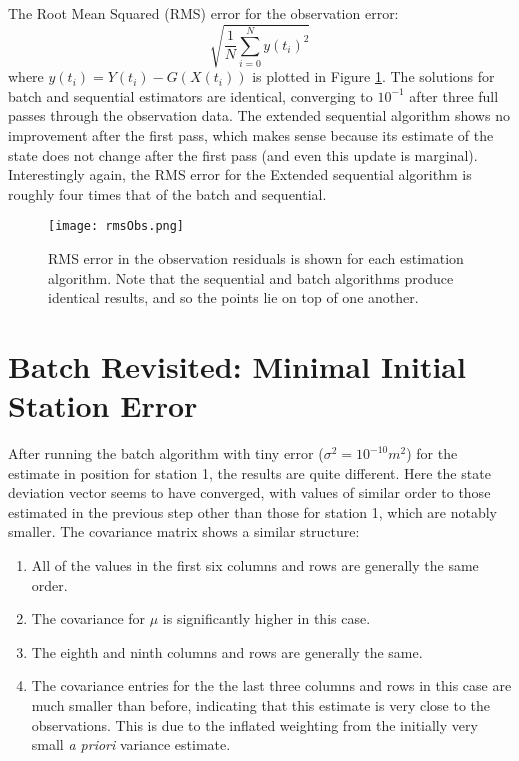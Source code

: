 \documentclass[a4paper,11pt]{article}
\begin{document}
  The Root Mean Squared (RMS) error for the observation error: 
    \begin{equation}
     \sqrt{\frac{1}{N}\sum_{i=0}^Ny(t_i)^2}     
    \end{equation}
  where $y(t_i) = Y(t_i) - G(X(t_i))$ is plotted in Figure \ref{fig:rmsObs}. The solutions for batch and sequential estimators are identical, converging to $10^{-1}$ after three full passes through the observation data. The extended sequential algorithm shows no improvement after the first pass, which makes sense because its estimate of the state does not change after the first pass (and even this update is marginal). Interestingly again, the RMS error for the Extended sequential algorithm is roughly four times that of the batch and sequential. 

	\begin{figure}
	\centering
	\texttt{[image: rmsObs.png]}
	\caption{RMS error in the observation residuals is shown for each estimation algorithm. Note that the sequential and batch algorithms produce identical results, and so the points lie on top of one another.}
	\label{fig:rmsObs}
	\end{figure}

\section{Batch Revisited: Minimal Initial Station Error}
\label{prob5}

	After running the batch algorithm with tiny error ($\sigma^2 = 10^{-10} m^2$) for the estimate in position for station 1, the results are quite different. Here the state deviation vector seems to have converged, with values of similar order to those estimated in the previous step other than those for station 1, which are notably smaller. The covariance matrix shows a similar structure:
	\begin{enumerate}
	  \item All of the values in the first six columns and rows are generally the same order. 
	  \item The covariance for $\mu$ is significantly higher in this case.
	  \item The eighth and ninth columns and rows are generally the same. 
	  \item The covariance entries for the the last three columns and rows in this case are much smaller than before, indicating that this estimate is very close to the observations. This is due to the inflated weighting from the initially very small \textit{a priori} variance estimate. 
	\end{enumerate}
\end{document}
